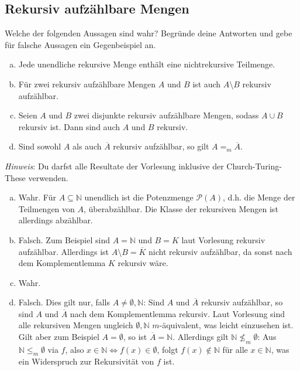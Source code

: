 \documentclass[german,headsepline]{scrartcl}
\theoremstyle{definition}
\begin{document}
	\subsection{Rekursiv aufzählbare Mengen}
	\begin{question}
		Welche der folgenden Aussagen sind wahr?
		Begründe deine Antworten und gebe für falsche Aussagen ein Gegenbeispiel an.
		\begin{enumerate}[(a)]
			\item Jede unendliche rekursive Menge enthält eine nichtrekursive Teilmenge.
			\item Für zwei rekursiv aufzählbare Mengen $A$ und $B$ ist auch $A\setminus B$ rekursiv aufzählbar.
			\item Seien $A$ und $B$ zwei disjunkte rekursiv aufzählbare Mengen, sodass $A\cup B$ rekursiv ist.
			Dann sind auch $A$ und $B$ rekursiv.
			\item Sind sowohl $A$ als auch $\overline{A}$ rekursiv aufzählbar, so gilt $A=_m\overline{A}$.
		\end{enumerate}
		\textit{Hinweis}: Du darfst alle Resultate der Vorlesung inklusive der Church-Turing-These verwenden.
	\end{question}
	\begin{solution}
		\begin{enumerate}[(a)]
			\item Wahr. Für $A\subseteq\mathbb{N}$ unendlich ist die Potenzmenge $\mathcal{P}(A)$,
			d.h. die Menge der Teilmengen von $A$, überabzählbar.
			Die Klasse der rekursiven Mengen ist allerdings abzählbar.
			\item Falsch. Zum Beispiel sind $A=\mathbb{N}$ und $B=K$ laut Vorlesung rekursiv aufzählbar.
			Allerdings ist $A\setminus B=\overline{K}$ nicht rekursiv aufzählbar,
			da sonst nach dem Komplementlemma $K$ rekursiv wäre.
			\item Wahr.
			\item Falsch. Dies gilt nur, falls $A\neq\emptyset,\mathbb{N}$:
			Sind $A$ und $\overline{A}$ rekursiv aufzählbar,
			so sind $A$ und $\overline{A}$ nach dem Komplementlemma rekursiv.
			Laut Vorlesung sind alle rekursiven Mengen ungleich $\emptyset,\mathbb{N}$ $m$-äquivalent,
			was leicht einzusehen ist. \\
			Gilt aber zum Beispiel $A=\emptyset$, so ist $\overline{A}=\mathbb{N}$.
			Allerdings gilt $\mathbb{N}\not\leq_m\emptyset$:
			Aus $\mathbb{N}\leq_m\emptyset$ via $f$, also $x\in\mathbb{N}\Leftrightarrow f(x)\in\emptyset$,
			folgt $f(x)\not\in\mathbb{N}$ für alle $x\in\mathbb{N}$,
			was ein Widerspruch zur Rekursivität von $f$ ist.
		\end{enumerate}
	\end{solution}
	
\end{document}
